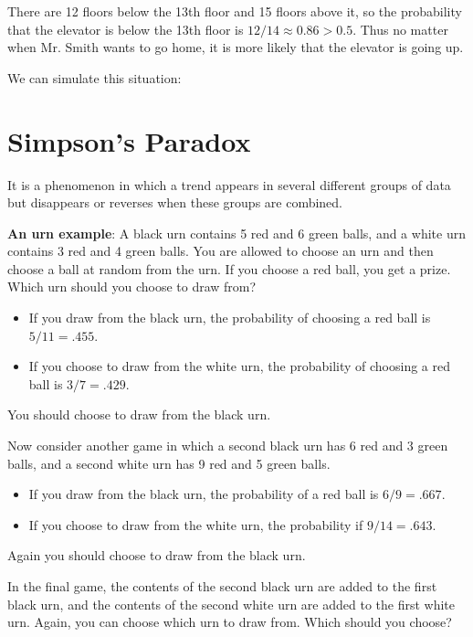 There are 12 floors below the 13th floor and 15 floors above it, so the probability that the elevator is below the 13th floor is $12/14\approx0.86>0.5$. Thus no matter when Mr. Smith wants to go home, it is more likely that the elevator is going up.

We can simulate this situation:




\hypertarget{simpsons-paradox}{%
\section{Simpson's Paradox}\label{simpsons-paradox}}

It is a phenomenon in which a trend appears in several different
groups of data but disappears or reverses when these groups are
combined.

\textbf{An urn example}: A black urn contains 5 red and 6 green balls,
and a white urn contains 3 red and 4 green balls. You are allowed to
choose an urn and then choose a ball at random from the urn. If you
choose a red ball, you get a prize. Which urn should you choose to
draw from?

\begin{itemize}
\item If you draw from the black urn, the probability of choosing a
  red ball is $5/11 = .455$.
\item If you choose to draw from the white urn, the probability of
  choosing a red ball is $3/7 = .429$.
\end{itemize}

You should choose to draw from the black urn.

Now consider another game in which a second black urn has 6 red and
3 green balls, and a second white urn has 9 red and 5 green balls.

\begin{itemize}
\item If you draw from the black urn, the probability of a red ball is
  $6/9 = .667$.
\item If you choose to draw from the white urn, the probability if
  $9/14 = .643$.
\end{itemize}

Again you should choose to draw from the black urn.

In the final game, the contents of the second black urn are added to
the first black urn, and the contents of the second white urn are
added to the first white urn. Again, you can choose which urn to draw
from. Which should you choose?


